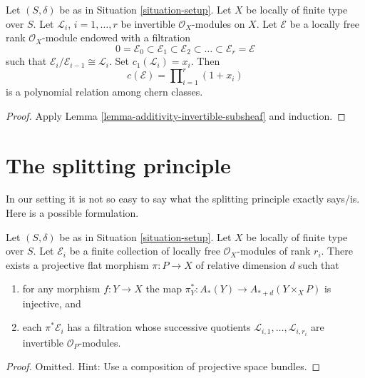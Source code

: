 \begin{lemma}
\label{lemma-chern-filter-by-linebundles}
Let $(S, \delta)$ be as in Situation \ref{situation-setup}.
Let $X$ be locally of finite type over $S$.
Let ${\mathcal L}_i$, $i = 1, \ldots, r$ be invertible
$\mathcal{O}_X$-modules on $X$.
Let $\mathcal{E}$ be a locally free rank
$\mathcal{O}_X$-module endowed with a filtration
$$
0 = \mathcal{E}_0 \subset \mathcal{E}_1 \subset \mathcal{E}_2
\subset \ldots \subset \mathcal{E}_r = \mathcal{E}
$$
such that $\mathcal{E}_i/\mathcal{E}_{i - 1} \cong \mathcal{L}_i$.
Set $c_1({\mathcal L}_i) = x_i$. Then
$$
c(\mathcal{E})
=
\prod\nolimits_{i = 1}^r (1 + x_i)
$$
is a polynomial relation among chern classes.
\end{lemma}

\begin{proof}
Apply Lemma \ref{lemma-additivity-invertible-subsheaf} and induction.
\end{proof}





\section{The splitting principle}
\label{section-splitting-principle}

\noindent
In our setting it is not so easy to say what the splitting principle
exactly says/is. Here is a possible formulation.

\begin{lemma}
\label{lemma-splitting-principle}
Let $(S, \delta)$ be as in Situation \ref{situation-setup}. Let $X$ be locally
of finite type over $S$. Let $\mathcal{E}_i$ be a finite collection of
locally free $\mathcal{O}_X$-modules of rank $r_i$. There exists a projective
flat morphism $\pi : P \to X$ of relative dimension $d$ such that
\begin{enumerate}
\item for any morphism $f : Y \to X$ the map
$\pi_Y^* : A_*(Y) \to A_{* + d}(Y \times_X P)$ is injective, and
\item each $\pi^*\mathcal{E}_i$ has a filtration
whose successive quotients $\mathcal{L}_{i, 1}, \ldots, \mathcal{L}_{i, r_i}$
are invertible ${\mathcal O}_P$-modules.
\end{enumerate}
\end{lemma}

\begin{proof}
Omitted. Hint: Use a composition of projective space bundles.
\end{proof}

